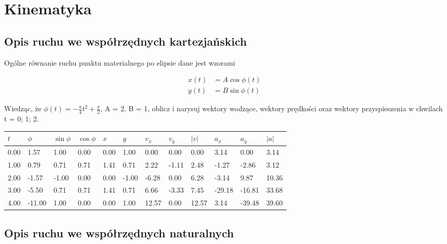 \section*{Kinematyka}

    \subsection*{Opis ruchu we współrzędnych kartezjańskich}
    
        Ogólne równanie ruchu punktu materialnego po elipsie dane jest wzorami
    
        \begin{align*}
            x(t) &= A \cos \phi(t) \\
            y(t) &= B \sin \phi(t)
        \end{align*}
        
        Wiedząc, że $\phi(t) = -\frac{\pi}{4}t^2 + \frac{\pi}{2}$, A = 2, B = 1, oblicz i narysuj wektory wodzące, wektory prędkości oraz wektory przyspieszenia w chwilach t = {0; 1; 2}.
    
        \begin{table}[H]\small
        \begin{tabular}{llllllllllll} \hline
        $t$  & $\phi$ & $\sin\phi$ & $\cos\phi$ & $x$  & $y$   & $v_x$ & $v_y$ & $|v|$ & $a_x$ & $a_y$  & $|a|$ \\ \hline
        0.00 & 1.57   & 1.00  & 0.00 & 0.00 & 1.00  & 0.00  & 0.00  & 0.00  & 3.14   & 0.00   & 3.14  \\ \hline
        1.00 & 0.79   & 0.71  & 0.71 & 1.41 & 0.71  & 2.22  & -1.11 & 2.48  & -1.27  & -2.86  & 3.12  \\
        2.00 & -1.57  & -1.00 & 0.00 & 0.00 & -1.00 & -6.28 & 0.00  & 6.28  & -3.14  & 9.87   & 10.36 \\
        3.00 & -5.50  & 0.71  & 0.71 & 1.41 & 0.71  & 6.66  & -3.33 & 7.45  & -29.18 & -16.81 & 33.68 \\
        4.00 & -11.00 & 1.00  & 0.00 & 0.00 & 1.00  & 12.57 & 0.00  & 12.57 & 3.14   & -39.48 & 39.60 \\ \hline
        \end{tabular}
        \end{table}
    
    \subsection*{Opis ruchu we współrzędnych naturalnych}
    
